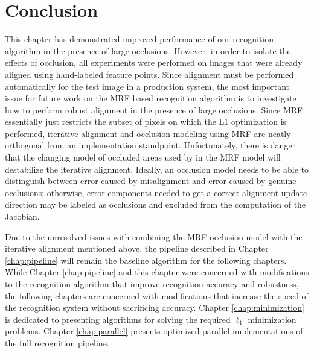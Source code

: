 \section{Conclusion} This chapter has demonstrated improved performance of our
recognition algorithm in the presence of large occlusions.  However, in order
to isolate the effects of occlusion, all experiments were performed on images
that were already aligned using hand-labeled feature points.  Since alignment
must be performed automatically for the test image in a production system, the
most important issue for future work on the MRF based recognition algorithm is
to investigate how to perform robust alignment in the presence of large
occlusions.  Since MRF essentially just restricts the subset of pixels on which
the L1 optimization is performed, iterative alignment and occlusion modeling
using MRF are neatly orthogonal from an implementation standpoint.  
Unfortunately, there is danger that the changing model of occluded areas
used by in the MRF model will destabilize the iterative alignment.  Ideally, an
occlusion model needs to be able to distinguish between error caused by
misalignment and error caused by genuine occlusions; otherwise, error
components needed to get a correct alignment update direction may be labeled as
occlusions and excluded from the computation of the Jacobian.

Due to the unresolved issues with combining the MRF occlusion model with the
iterative alignment mentioned above, the pipeline described in Chapter
\ref{chap:pipeline} will remain the baseline algorithm for the following
chapters.  While Chapter \ref{chap:pipeline} and this chapter were concerned
with modifications to the recognition algorithm that improve recognition
accuracy and robustness, the following chapters are concerned with
modifications that increase the speed of the recognition system without
sacrificing accuracy.  Chapter \ref{chap:minimization} is dedicated to
presenting algorithms for solving the required $\ell_1$ minimization problems.
Chapter \ref{chap:parallel} presents optimized parallel implementations of the
full recognition pipeline.


